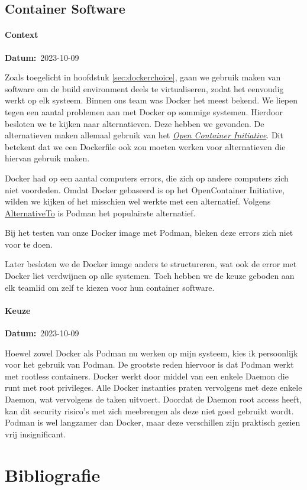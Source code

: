 \documentclass[a4paper]{report}
\newcommand{\personalbox}{
  \begin{tcolorbox}[hbox, colback=green!5!white,colframe=green!75!black,
    left=.1mm, right=.1mm, top=.1mm, bottom=.1mm, fontupper=\scriptsize\sffamily]
    Persoonlijke Keuze
  \end{tcolorbox}
}
\newcommand{\personalchoice}[1]{
  \section[ #1 ]{#1~\mbox{\raisebox{-2.5pt}{\personalbox}}}
}
\newcommand{\timestamp}[1]{
  \mbox{\scriptsize \textbf{Datum:} #1} \smallbreak
}
\begin{document}
\personalchoice{Container Software}
\subsubsection{Context}
\timestamp{2023-10-09}
Zoals toegelicht in hoofdstuk \ref{sec:dockerchoice}, gaan we gebruik maken van software om de build environment deels te virtualiseren, zodat het eenvoudig werkt op elk systeem.
Binnen ons team was Docker het meest bekend. We liepen tegen een aantal problemen aan met Docker op sommige systemen. 
Hierdoor besloten we te kijken naar alternatieven. Deze hebben we gevonden. De alternatieven maken allemaal gebruik van het \href{https://opencontainers.org/}{\textit{Open Container Initiative}}.
Dit betekent dat we een Dockerfile ook zou moeten werken voor alternatieven die hiervan gebruik maken.
\par\smallskip
Docker had op een aantal computers errors, die zich op andere computers zich niet voordeden. 
Omdat Docker gebaseerd is op het OpenContainer Initiative, wilden we kijken of het misschien wel werkte met een alternatief.
Volgens \href{https://alternativeto.net/software/docker/}{AlternativeTo} is Podman het populairste alternatief.
\par\smallskip
Bij het testen van onze Docker image met Podman, bleken deze errors zich niet voor te doen.
\par\smallskip 
Later besloten we de Docker image anders te structureren, wat ook de error met Docker liet verdwijnen op alle systemen. 
Toch hebben we de keuze geboden aan elk teamlid om zelf te kiezen voor hun container software.

\subsubsection{Keuze}
\timestamp{2023-10-09}
Hoewel zowel Docker als Podman nu werken op mijn systeem, kies ik persoonlijk voor het gebruik van Podman.
De grootste reden hiervoor is dat Podman werkt met rootless containers. Docker werkt door middel van een enkele Daemon die runt met root privileges. 
Alle Docker instanties praten vervolgens met deze enkele Daemon, wat vervolgens de taken uitvoert. Doordat de Daemon root access heeft, kan dit security risico's met zich meebrengen als deze niet goed gebruikt wordt\cite{dockerdaemonrisks}.
Podman is wel langzamer dan Docker, maar deze verschillen zijn praktisch gezien vrij insignificant\cite{dockerperformance}.


\chapter{Bibliografie}
\begingroup
\end{document}

